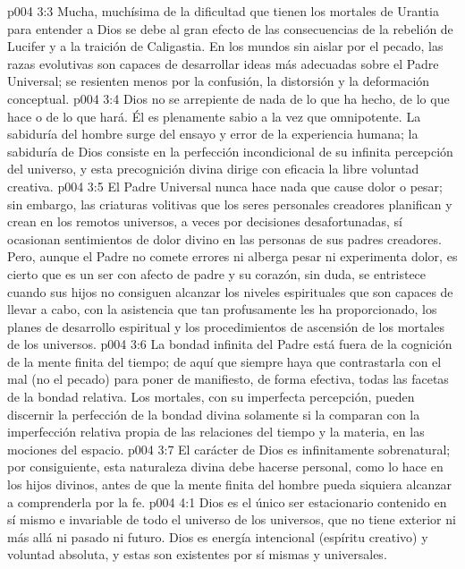 \vs p004 3:3 \pc Mucha, muchísima de la dificultad que tienen los mortales de Urantia para entender a Dios se debe al gran efecto de las consecuencias de la rebelión de Lucifer y a la traición de Caligastia. En los mundos sin aislar por el pecado, las razas evolutivas son capaces de desarrollar ideas más adecuadas sobre el Padre Universal; se resienten menos por la confusión, la distorsión y la deformación conceptual.
\vs p004 3:4 \pc Dios no se arrepiente de nada de lo que ha hecho, de lo que hace o de lo que hará. Él es plenamente sabio a la vez que omnipotente. La sabiduría del hombre surge del ensayo y error de la experiencia humana; la sabiduría de Dios consiste en la perfección incondicional de su infinita percepción del universo, y esta precognición divina dirige con eficacia la libre voluntad creativa.
\vs p004 3:5 El Padre Universal nunca hace nada que cause dolor o pesar; sin embargo, las criaturas volitivas que los seres personales creadores planifican y crean en los remotos universos, a veces por decisiones desafortunadas, sí ocasionan sentimientos de dolor divino en las personas de sus padres creadores. Pero, aunque el Padre no comete errores ni alberga pesar ni experimenta dolor, es cierto que es un ser con afecto de padre y su corazón, sin duda, se entristece cuando sus hijos no consiguen alcanzar los niveles espirituales que son capaces de llevar a cabo, con la asistencia que tan profusamente les ha proporcionado, los planes de desarrollo espiritual y los procedimientos de ascensión de los mortales de los universos.
\vs p004 3:6 La bondad infinita del Padre está fuera de la cognición de la mente finita del tiempo; de aquí que siempre haya que contrastarla con el mal (no el pecado) para poner de manifiesto, de forma efectiva, todas las facetas de la bondad relativa. Los mortales, con su imperfecta percepción, pueden discernir la perfección de la bondad divina solamente si la comparan con la imperfección relativa propia de las relaciones del tiempo y la materia, en las mociones del espacio.
\vs p004 3:7 El carácter de Dios es infinitamente sobrenatural; por consiguiente, esta naturaleza divina debe hacerse personal, como lo hace en los hijos divinos, antes de que la mente finita del hombre pueda siquiera alcanzar a comprenderla por la fe.
\vs p004 4:1 Dios es el único ser estacionario contenido en sí mismo e invariable de todo el universo de los universos, que no tiene exterior ni más allá ni pasado ni futuro. Dios es energía intencional (espíritu creativo) y voluntad absoluta, y estas son existentes por sí mismas y universales.
